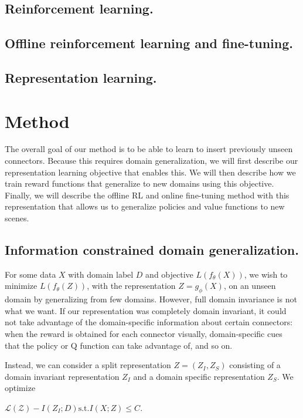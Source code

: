 \documentclass{article}
\begin{document}
\subsection{Reinforcement learning.}

\subsection{Offline reinforcement learning and fine-tuning.}


\subsection{Representation learning.}

\section{Method}

The overall goal of our method is to be able to learn to insert previously unseen connectors. Because this requires domain generalization, we will first describe our representation learning objective that enables this. We will then describe how we train reward functions that generalize to new domains using this objective. Finally, we will describe the offline RL and online fine-tuning method with this representation that allows us to generalize policies and value functions to new scenes.

\subsection{Information constrained domain generalization.}

For some data $X$ with domain label $D$ and objective $L(f_\theta(X))$, we wish to minimize $L(f_\theta(Z))$, with the representation $Z=g_\phi(X)$, on an unseen domain by generalizing from few domains. However, full domain invariance is not what we want. If our representation was completely domain invariant, it could not take advantage of the domain-specific information about certain connectors: when the reward is obtained for each connector visually, domain-specific cues that the policy or Q function can take advantage of, and so on.

Instead, we can consider a split representation $Z = (Z_I, Z_S)$ consisting of a domain invariant representation $Z_I$ and a domain specific representation $Z_S$. We optimize

$\mathcal{L(Z)} - I(Z_I; D) \text{s.t.} I(X; Z) \leq C$.
\end{document}
